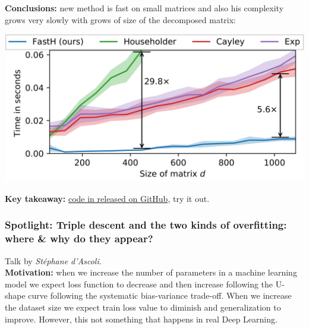 {\bf Conclusions:} new method is fast on small matrices and also his complexity grows very slowly with grows of size of the decomposed matrix: \\
\begin{center}
  \includegraphics[scale=0.2]{neurips-2020/images/fastH.png} \\
\end{center}

{\bf Key takeaway:} \href{https://github.com/AlexanderMath/fasth/}{code in released on GitHub}, try it out. \\


\subsubsection{Spotlight: Triple descent and the two kinds of overfitting: where & why do they appear? \cite{dascoli2020triple}}

Talk by \textit{Stéphane d'Ascoli}. \\

{\bf Motivation:} when we increase the number of parameters in a machine learning model we expect loss function to decrease and then increase following the U-shape curve following the systematic bias-variance trade-off. When we increase the dataset size we expect train loss value to diminish and generalization to improve.
However, this not something that happens in real Deep Learning. \\

